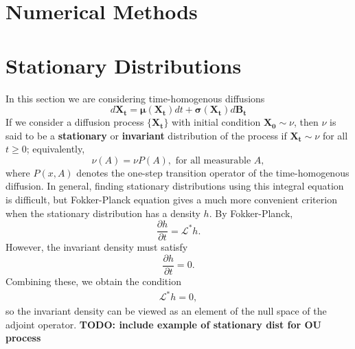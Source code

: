 \documentclass[12pt]{article}
\newcommand{\B}[1]{\boldsymbol{#1}}
\newcommand{\state}[1][t]{X_{#1}}
\newcommand{\BM}[1][t]{B_{#1}} %
\newcommand{\gen}{\mathcal{L}} %
\newcommand{\invariantDens}{h} %
\begin{document}
\section{Numerical Methods}



\section{Stationary Distributions}
In this section we are considering time-homogenous diffusions 
\[
d\B\state = \B\mu(\B\state) dt + \B\sigma(\B\state) d\B\BM
\]
If we consider a diffusion process $\{\B\state\}$ with initial condition $\B{\state[0]} \sim \nu$, then $\nu$ is said to be a \textbf{stationary} or \textbf{invariant}
distribution of the process if $\B\state \sim \nu$ for all $t \geq 0$; equivalently, 
\[
\nu(A) = \nu P(A), \text{ for all measurable } A,
\]
where $P(x,A)$ denotes the one-step transition operator of the time-homogenous diffusion. In general, finding stationary distributions using this integral 
equation is difficult, but Fokker-Planck equation gives a much more convenient criterion when the stationary distribution has a density $\invariantDens$. By Fokker-Planck, 
\[
\frac{\partial \invariantDens}{\partial t} = \gen^* \invariantDens.
\]
However, the invariant density must satisfy 
\[
\frac{\partial \invariantDens}{\partial t} = 0.
\]
Combining these, we obtain the condition 
\begin{align}
\gen^* \invariantDens = 0, 
\end{align}
so the invariant density can be viewed as an element of the null space of the adjoint operator. \textbf{TODO: include example of stationary dist for OU process}
\end{document}
